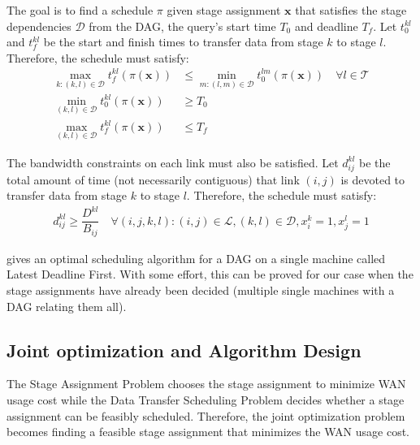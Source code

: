 The goal is to find a schedule $\pi$ given stage assignment $\mathbf{x}$ that satisfies the stage dependencies $\mathcal{D}$ from the DAG, the query's start time $T_0$ and deadline $T_f$.
Let $t_0^{kl}$ and $t_f^{kl}$ be the start and finish times to transfer data from stage $k$ to stage $l$.
Therefore, the schedule must satisfy:
\begin{subequations}
	\begin{align}
		\max_{k:(k,l)\in\mathcal{D}}t_f^{kl}(\pi(\mathbf{x})) & \leq \min_{m:(l,m)\in\mathcal{D}}t_0^{lm}(\pi(\mathbf{x})) \quad \forall l\in\mathcal{T} \\
		\min_{(k,l)\in\mathcal{D}}t_0^{kl}(\pi(\mathbf{x})) & \geq T_0 \\
		\max_{(k,l)\in\mathcal{D}}t_f^{kl}(\pi(\mathbf{x})) & \leq T_f
	\end{align}
\end{subequations}

The bandwidth constraints on each link must also be satisfied.
Let $d_{ij}^{kl}$ be the total amount of time (not necessarily contiguous) that link $(i,j)$ is devoted to transfer data from stage $k$ to stage $l$.
Therefore, the schedule must satisfy:
\begin{align}
	d_{ij}^{kl} \geq \dfrac{D^{kl}}{B_{ij}} \quad \forall (i,j,k,l): (i,j)\in\mathcal{L},(k,l)\in\mathcal{D},x_i^k=1,x_j^l=1
\end{align}

\begin{conjecture}
	\cite{lawler1973optimal} gives an optimal scheduling algorithm for a DAG on a single machine called Latest Deadline First.
	With some effort, this can be proved for our case when the stage assignments have already been decided (multiple single machines with a DAG relating them all). 
\end{conjecture}


\subsection{Joint optimization and Algorithm Design}

The Stage Assignment Problem chooses the stage assignment to minimize WAN usage cost while the Data Transfer Scheduling Problem decides whether a stage assignment can be feasibly scheduled.
Therefore, the joint optimization problem becomes finding a feasible stage assignment that minimizes the WAN usage cost.

